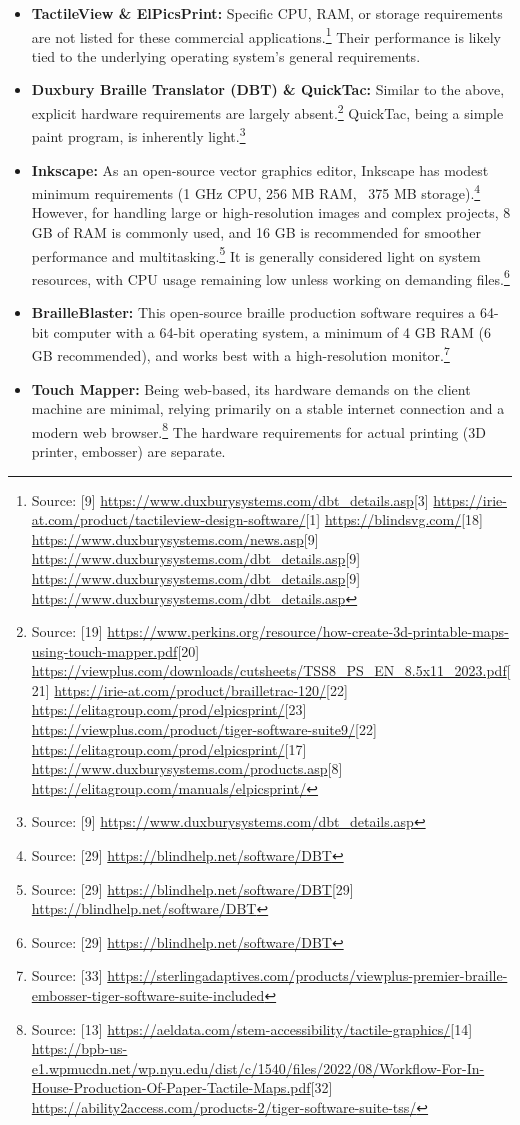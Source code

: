 \begin{itemize}
    \item \textbf{TactileView \& ElPicsPrint:} Specific CPU, RAM, or storage requirements are not listed for these commercial applications.\footnote{Source: [9] \url{https://www.duxburysystems.com/dbt_details.asp}[3] \url{https://irie-at.com/product/tactileview-design-software/}[1] \url{https://blindsvg.com/}[18] \url{https://www.duxburysystems.com/news.asp}[9] \url{https://www.duxburysystems.com/dbt_details.asp}[9] \url{https://www.duxburysystems.com/dbt_details.asp}[9] \url{https://www.duxburysystems.com/dbt_details.asp}} Their performance is likely tied to the underlying operating system's general requirements.
    \item \textbf{Duxbury Braille Translator (DBT) \& QuickTac:} Similar to the above, explicit hardware requirements are largely absent.\footnote{Source: [19] \url{https://www.perkins.org/resource/how-create-3d-printable-maps-using-touch-mapper.pdf}[20] \url{https://viewplus.com/downloads/cutsheets/TSS8_PS_EN_8.5x11_2023.pdf}[21] \url{https://irie-at.com/product/brailletrac-120/}[22] \url{https://elitagroup.com/prod/elpicsprint/}[23] \url{https://viewplus.com/product/tiger-software-suite9/}[22] \url{https://elitagroup.com/prod/elpicsprint/}[17] \url{https://www.duxburysystems.com/products.asp}[8] \url{https://elitagroup.com/manuals/elpicsprint/}} QuickTac, being a simple paint program, is inherently light.\footnote{Source: [9] \url{https://www.duxburysystems.com/dbt_details.asp}}
    \item \textbf{Inkscape:} As an open-source vector graphics editor, Inkscape has modest minimum requirements (1 GHz CPU, 256 MB RAM, ~375 MB storage).\footnote{Source: [29] \url{https://blindhelp.net/software/DBT}} However, for handling large or high-resolution images and complex projects, 8 GB of RAM is commonly used, and 16 GB is recommended for smoother performance and multitasking.\footnote{Source: [29] \url{https://blindhelp.net/software/DBT}[29] \url{https://blindhelp.net/software/DBT}} It is generally considered light on system resources, with CPU usage remaining low unless working on demanding files.\footnote{Source: [29] \url{https://blindhelp.net/software/DBT}}
    \item \textbf{BrailleBlaster:} This open-source braille production software requires a 64-bit computer with a 64-bit operating system, a minimum of 4 GB RAM (6 GB recommended), and works best with a high-resolution monitor.\footnote{Source: [33] \url{https://sterlingadaptives.com/products/viewplus-premier-braille-embosser-tiger-software-suite-included}}
    \item \textbf{Touch Mapper:} Being web-based, its hardware demands on the client machine are minimal, relying primarily on a stable internet connection and a modern web browser.\footnote{Source: [13] \url{https://aeldata.com/stem-accessibility/tactile-graphics/}[14] \url{https://bpb-us-e1.wpmucdn.net/wp.nyu.edu/dist/c/1540/files/2022/08/Workflow-For-In-House-Production-Of-Paper-Tactile-Maps.pdf}[32] \url{https://ability2access.com/products-2/tiger-software-suite-tss/}} The hardware requirements for actual printing (3D printer, embosser) are separate.
\end{itemize}

